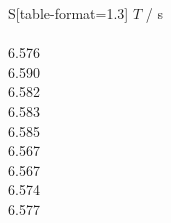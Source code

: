 \begin{subtable}{0.18\textwidth}
\centering
{}
\label{tab:magnet2-0}
\begin{tabular}{S[table-format=1.3]}
\toprule
{$T$ / s} \\
 \\
6.576 \\
6.590 \\
6.582 \\
6.583 \\
6.585 \\
6.567 \\
6.567 \\
6.574 \\
6.577 \\
\bottomrule
\end{tabular}
\end{subtable}